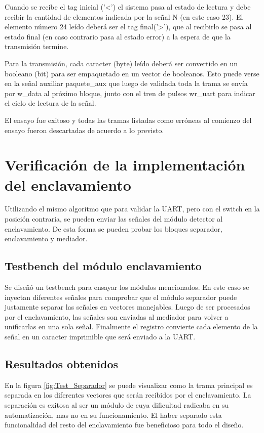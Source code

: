 		Cuando se recibe el tag inicial ('<') el sistema pasa al estado de lectura y debe recibir la cantidad de elementos indicada por la señal N (en este caso 23). El elemento número 24 leído deberá ser el tag final('>'), que al recibirlo se pasa al estado final (en caso contrario pasa al estado error) a la espera de que la transmisión termine.
		
		Para la transmisión, cada caracter (byte) leído deberá ser convertido en un booleano (bit) para ser empaquetado en un vector de booleanos. Esto puede verse en la señal auxiliar paquete\_aux que luego de validada toda la trama se envía por w\_data al próximo bloque, junto con el tren de pulsos wr\_uart para indicar el ciclo de lectura de la señal.
		
		El ensayo fue exitoso y todas las tramas listadas como erróneas al comienzo del ensayo fueron descartadas de acuerdo a lo previsto.
		
\section{Verificación de la implementación del enclavamiento}	

	Utilizando el mismo algoritmo que para validar la UART, pero con el switch en la posición contraria, se pueden enviar las señales del módulo detector al enclavamiento. De esta forma se pueden probar los bloques separador, enclavamiento y mediador.
	
	\subsection{Testbench del módulo enclavamiento}
			
		Se diseñó un testbench para ensayar los módulos mencionados. En este caso se inyectan diferentes señales para comprobar que el módulo separador puede justamente separar las señales en vectores manejables. Luego de ser procesados por el enclavamiento, las señales son enviadas al mediador para volver a unificarlas en una sola señal. Finalmente el registro convierte cada elemento de la señal en un caracter imprimible que será enviado a la UART.		
						
	\subsection{Resultados obtenidos}
				
		En la figura \ref{fig:Test_Separador} se puede visualizar como la trama principal es separada en los diferentes vectores que serán recibidos por el enclavamiento. La separación es exitosa al ser un módulo de cuya dificultad radicaba en su automatización, mas no en su funcionamiento. El haber separado esta funcionalidad del resto del enclavamiento fue beneficioso para todo el diseño.
		
